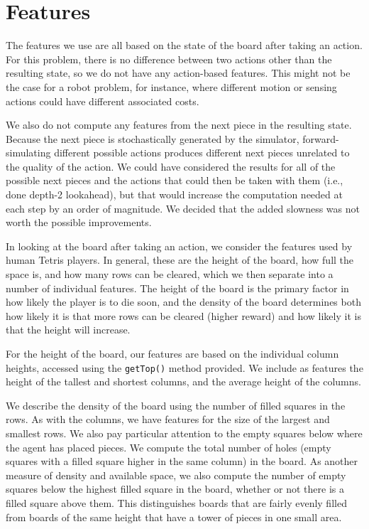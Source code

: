 \documentclass[11pt]{article}
\begin{document}
\section{Features}

The features we use are all based on the state of the board after taking an action.  For this problem, there is no difference between two actions other than the resulting state, so we do not have any action-based features.  This might not be the case for a robot problem, for instance, where different motion or sensing actions could have different associated costs.

We also do not compute any features from the next piece in the resulting state.  Because the next piece is stochastically generated by the simulator, forward-simulating different possible actions produces different next pieces unrelated to the quality of the action.  We could have considered the results for all of the possible next pieces and the actions that could then be taken with them (i.e., done depth-2 lookahead), but that would increase the computation needed at each step by an order of magnitude.  We decided that the added slowness was not worth the possible improvements.

In looking at the board after taking an action, we consider the features used by human Tetris players.  In general, these are the height of the board, how full the space is, and how many rows can be cleared, which we then separate into a number of individual features.  The height of the board is the primary factor in how likely the player is to die soon, and the density of the board determines both how likely it is that more rows can be cleared (higher reward) and how likely it is that the height will increase.

For the height of the board, our features are based on the individual column heights, accessed using the \texttt{getTop()} method provided.  We include as features the height of the tallest and shortest columns, and the average height of the columns.

We describe the density of the board using the number of filled squares in the rows.  As with the columns, we have features for the size of the largest and smallest rows.  We also pay particular attention to the empty squares below where the agent has placed pieces.  We compute the total number of holes (empty squares with a filled square higher in the same column) in the board.  As another measure of density and available space, we also compute the number of empty squares below the highest filled square in the board, whether or not there is a filled square above them.  This distinguishes boards that are fairly evenly filled from boards of the same height that have a tower of pieces in one small area.
\end{document}
